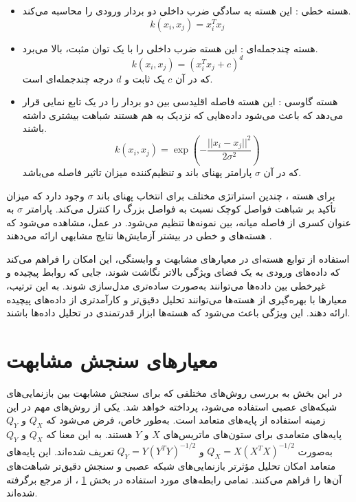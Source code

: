 \begin{itemize}
\item
هسته خطی%
:
این هسته به سادگی ضرب داخلی دو بردار ورودی را محاسبه می‌کند.
\begin{equation}
	k(x_i, x_j) = x_i^T x_j
\end{equation}
	
	
	
\item 
هسته چندجمله‌ای%
:
این هسته ضرب داخلی را با یک توان مثبت، بالا می‌برد.
\begin{equation}
	k(x_i, x_j) = (x_i^T x_j + c)^d
\end{equation}
که در آن \( c \) یک ثابت و \( d \) درجه چندجمله‌ای است.

	
\item
هسته گاوسی
%
:
این هسته فاصله اقلیدسی بین دو بردار را در یک تابع نمایی قرار می‌دهد که باعث می‌شود داده‌هایی که نزدیک به هم هستند شباهت بیشتری داشته باشند.
\begin{equation}
	k(x_i, x_j) = \exp\left(-\frac{||x_i - x_j||^2}{2\sigma^2}\right)
\end{equation}
که در آن \( \sigma \) پارامتر پهنای باند و تنظیم‌کننده میزان تاثیر فاصله می‌باشد.
\end{itemize}

برای هسته
%
، چندین استراتژی مختلف برای انتخاب پهنای باند \(\sigma\) وجود دارد که میزان تأکید بر شباهت فواصل کوچک نسبت به فواصل بزرگ را کنترل می‌کند. پارامتر \(\sigma\) به عنوان کسری از فاصله میانه، بین نمونه‌ها تنظیم می‌شود. در عمل، مشاهده می‌شود که هسته‌های
و خطی در بیشتر آزمایش‌ها نتایج مشابهی ارائه می‌دهند
\cite{kornblith2019similarity}.

استفاده از توابع هسته‌ای در معیارهای مشابهت و وابستگی، این امکان را فراهم می‌کند که داده‌های ورودی به یک فضای ویژگی بالاتر نگاشت شوند، جایی که روابط پیچیده و غیرخطی بین داده‌ها می‌توانند به‌صورت ساده‌تری مدل‌سازی شوند. به این ترتیب، معیارها با بهره‌گیری از هسته‌ها می‌توانند تحلیل دقیق‌تر و کارآمدتری از داده‌های پیچیده ارائه دهند. این ویژگی باعث می‌شود که هسته‌ها ابزار قدرتمندی در تحلیل داده‌ها باشند.



\section{
	معیار‌های سنجش مشابهت
}\label{sec_similarity_measurement_criteria}
در این بخش به بررسی روش‌های مختلفی که برای سنجش مشابهت بین بازنمایی‌های شبکه‌های عصبی استفاده می‌شود، پرداخته خواهد شد. یکی از روش‌های مهم در این زمینه استفاده از پایه‌های متعامد است. به‌طور خاص، فرض می‌شود که \( Q_X \) و \( Q_Y \) پایه‌های متعامدی برای ستون‌های ماتریس‌های \( X \) و \( Y \) هستند. به این معنا که \( Q_X \) و \( Q_Y \) به‌صورت \( Q_X = X(X^T X)^{-1/2} \) و \( Q_Y = Y(Y^T Y)^{-1/2} \) تعریف شده‌اند. این پایه‌های متعامد امکان تحلیل مؤثرتر بازنمایی‌های شبکه عصبی و سنجش دقیق‌تر شباهت‌های آن‌ها را فراهم می‌کنند.
تمامی رابطه‌های مورد استفاده در بخش
\ref{sec_similarity_measurement_criteria}%
، از مرجع 
\cite{kornblith2019similarity} 
برگرفته شده‌اند.


